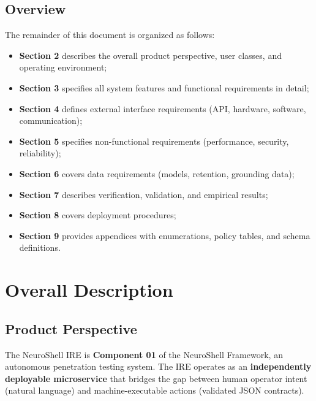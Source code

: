 ﻿\documentclass[10pt,journal,onecolumn]{IEEEtran}
\begin{document}
\subsection{Overview}
The remainder of this document is organized as follows:
\begin{itemize}
\item \textbf{Section 2} describes the overall product perspective, user classes, and operating environment;
\item \textbf{Section 3} specifies all system features and functional requirements in detail;
\item \textbf{Section 4} defines external interface requirements (API, hardware, software, communication);
\item \textbf{Section 5} specifies non-functional requirements (performance, security, reliability);
\item \textbf{Section 6} covers data requirements (models, retention, grounding data);
\item \textbf{Section 7} describes verification, validation, and empirical results;
\item \textbf{Section 8} covers deployment procedures;
\item \textbf{Section 9} provides appendices with enumerations, policy tables, and schema definitions.
\end{itemize}
\section{Overall Description}

\subsection{Product Perspective}
The NeuroShell IRE is \textbf{Component 01} of the NeuroShell Framework, an autonomous penetration testing system. The IRE operates as an \textbf{independently deployable microservice} that bridges the gap between human operator intent (natural language) and machine-executable actions (validated JSON contracts).
\end{document}

